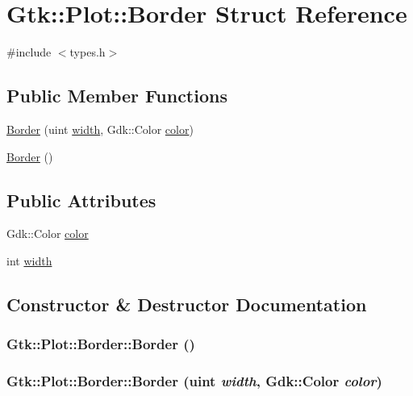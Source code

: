 \hypertarget{structGtk_1_1Plot_1_1Border}{
\section{Gtk::Plot::Border Struct Reference}
\label{structGtk_1_1Plot_1_1Border}
}


{\ttfamily \#include $<$types.h$>$}\subsection*{Public Member Functions}
\begin{DoxyCompactItemize}
\item 
\hyperlink{structGtk_1_1Plot_1_1Border_ac71ae8c91299f3e8b7bcc3e2fc80a730}{Border} (uint \hyperlink{structGtk_1_1Plot_1_1Border_a15d421e0b7a30728752521b6940a8e0f}{width}, Gdk::Color \hyperlink{structGtk_1_1Plot_1_1Border_ae1cf991b6276925a1c35c58343658b8e}{color})
\item 
\hyperlink{structGtk_1_1Plot_1_1Border_a4dab66945a2c76df91db3bdd4a83934c}{Border} ()
\end{DoxyCompactItemize}
\subsection*{Public Attributes}
\begin{DoxyCompactItemize}
\item 
Gdk::Color \hyperlink{structGtk_1_1Plot_1_1Border_ae1cf991b6276925a1c35c58343658b8e}{color}
\item 
int \hyperlink{structGtk_1_1Plot_1_1Border_a15d421e0b7a30728752521b6940a8e0f}{width}
\end{DoxyCompactItemize}


\subsection{Constructor \& Destructor Documentation}
\hypertarget{structGtk_1_1Plot_1_1Border_a4dab66945a2c76df91db3bdd4a83934c}{
\subsubsection[{Border}]{\setlength{\rightskip}{0pt plus 5cm}Gtk::Plot::Border::Border ()}}
\label{structGtk_1_1Plot_1_1Border_a4dab66945a2c76df91db3bdd4a83934c}
\hypertarget{structGtk_1_1Plot_1_1Border_ac71ae8c91299f3e8b7bcc3e2fc80a730}{
\subsubsection[{Border}]{\setlength{\rightskip}{0pt plus 5cm}Gtk::Plot::Border::Border (uint {\em width}, \/  Gdk::Color {\em color})}}
\label{structGtk_1_1Plot_1_1Border_ac71ae8c91299f3e8b7bcc3e2fc80a730}


